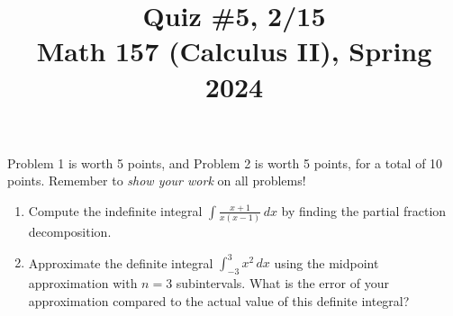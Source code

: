 \documentclass[11pt]{article}
\title{Quiz \#5, 2/15 \\ Math 157 (Calculus II), Spring 2024}
\date{}
\begin{document}
\maketitle

\thispagestyle{empty}

\vspace{-2cm}

Problem 1 is worth 5 points, and Problem 2 is worth 5 points, for a total of 10 points. Remember to \emph{show your work} on all problems!

\begin{enumerate}
\item Compute the indefinite integral $\displaystyle \int \frac{x+1}{x(x-1)} \, dx$ by finding the partial fraction decomposition.

\vspace{7.5cm}

\item Approximate the definite integral $\displaystyle \int_{-3}^{3} x^2 \, dx$ using the midpoint approximation with $n=3$ subintervals. What is the error of your approximation compared to the actual value of this definite integral?

\end{enumerate}
\end{document}
